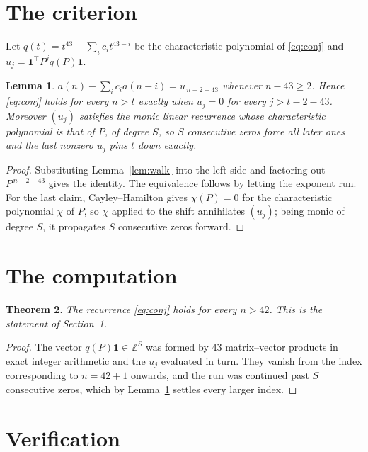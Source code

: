 \documentclass[11pt,a4paper]{article}
\theoremstyle{plain}
\newtheorem{theorem}{Theorem}
\newtheorem{lemma}[theorem]{Lemma}
\theoremstyle{definition}
\begin{document}
\section{The criterion}

Let $q(t)=t^{43}-\sum_i c_i t^{43-i}$ be the characteristic polynomial of
\eqref{eq:conj} and $u_j=\mathbf{1}^{\!\top}P^{j}q(P)\mathbf{1}$.

\begin{lemma}\label{lem:crit}
$a(n)-\sum_i c_i a(n-i)=u_{\,n-2-43}$ whenever $n-43\ge2$. Hence
\eqref{eq:conj} holds for every $n>t$ exactly when $u_j=0$ for every
$j>t-2-43$. Moreover $(u_j)$ satisfies the monic linear recurrence whose
characteristic polynomial is that of $P$, of degree $S$, so $S$ consecutive zeros force all
later ones and the last nonzero $u_j$ pins $t$ down exactly.
\end{lemma}

\begin{proof}
Substituting Lemma~\ref{lem:walk} into the left side and factoring out
$P^{\,n-2-43}$ gives the identity. The equivalence follows by letting the exponent
run. For the last claim, Cayley--Hamilton gives $\chi(P)=0$ for the characteristic
polynomial $\chi$ of $P$, so $\chi$ applied to the shift annihilates $(u_j)$; being monic of
degree $S$, it propagates $S$ consecutive zeros forward.
\end{proof}

\section{The computation}

\begin{theorem}
The recurrence \eqref{eq:conj} holds for every $n>42$. This is the statement of
Section~1.
\end{theorem}

\begin{proof}
The vector $q(P)\mathbf{1}\in\mathbb{Z}^{S}$ was formed by $43$ matrix--vector
products in exact integer arithmetic and the $u_j$ evaluated in turn. They vanish from the
index corresponding to $n=42+1$ onwards, and the run was continued past $S$ consecutive
zeros, which by Lemma~\ref{lem:crit} settles every larger index.
\end{proof}

\section{Verification}
\end{document}
